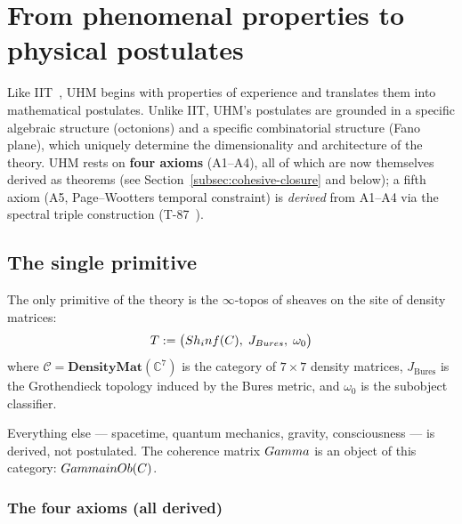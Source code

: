 
\section{From phenomenal properties to physical postulates}
\label{sec:axioms}

Like IIT~\cite{iit4}, UHM begins with properties of experience and translates them into
mathematical postulates. Unlike IIT, UHM's postulates are grounded in a specific algebraic
structure (octonions) and a specific combinatorial structure (Fano plane), which uniquely
determine the dimensionality and architecture of the theory. UHM rests on \textbf{four axioms} (A1--A4), all of which are now themselves derived
as theorems (see Section~\ref{subsec:cohesive-closure} and below); a fifth axiom (A5,
Page--Wootters temporal constraint) is \emph{derived} from A1--A4 via the spectral triple
construction (T-87~).

\subsection{The single primitive}

\begin{axiombox}
The only primitive of the theory is the $\infty$-topos of sheaves on the site of density
matrices:
\begin{equation}
  T := \bigl(Sh_inf(C),\; J_{Bures},\; \omega_0\bigr)
\end{equation}
where $\mathcal{C} = \mathbf{DensityMat}(\mathbb{C}^7)$ is the category of $7 \times 7$
density matrices, $J_{\mathrm{Bures}}$ is the Grothendieck topology induced by the Bures
metric, and $\omega_0$ is the subobject classifier.
\end{axiombox}

Everything else --- spacetime, quantum mechanics, gravity, consciousness --- is derived, not
postulated. The coherence matrix $Gamma$ is an object of this category:
$Gamma in Ob(C)$.

\subsubsection*{The four axioms (all derived)}

